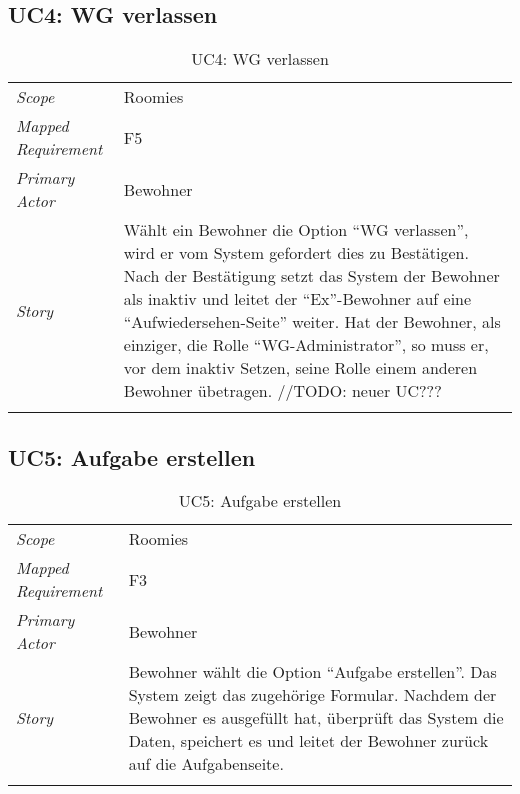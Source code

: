 \subsection{UC4: WG verlassen}\label{subsec:uc4}
\begin{table}[H]
	\tablestyle
	\tablealtcolored
	\begin{tabularx}{\textwidth}{lX}
		\tablebody
			\textit{Scope} &
			Roomies
			\tabularnewline
			\textit{Mapped Requirement} &
			F5
			\tabularnewline
			\textit{Primary Actor} &
			Bewohner
			\tabularnewline
			\textit{Story} &
			Wählt ein Bewohner die Option ``WG verlassen'', wird er vom System gefordert dies zu Bestätigen. Nach der Bestätigung setzt das System der Bewohner als inaktiv und leitet der ``Ex''-Bewohner auf eine ``Aufwiedersehen-Seite'' weiter. \newline
			Hat der Bewohner, als einziger, die Rolle ``WG-Administrator'', so muss er, vor dem inaktiv Setzen, seine Rolle einem anderen Bewohner übetragen. \newline//TODO: neuer UC???
			\tabularnewline
		\tableend
	\end{tabularx}
	\caption{UC4: WG verlassen}
\end{table}


\subsection{UC5: Aufgabe erstellen}\label{subsec:uc5}
\begin{table}[H]
	\tablestyle
	\tablealtcolored
	\begin{tabularx}{\textwidth}{lX}
		\tablebody
			\textit{Scope} &
			Roomies
			\tabularnewline
			\textit{Mapped Requirement} &
			F3
			\tabularnewline
			\textit{Primary Actor} &
			Bewohner
			\tabularnewline
			\textit{Story} &
			Bewohner wählt die Option ``Aufgabe erstellen''. Das System zeigt das zugehörige Formular. Nachdem der Bewohner es ausgefüllt hat, überprüft das System die Daten, speichert es und leitet der Bewohner zurück auf die Aufgabenseite.
			\tabularnewline
		\tableend
	\end{tabularx}
	\caption{UC5: Aufgabe erstellen}
\end{table}


